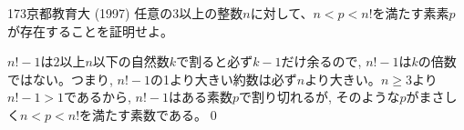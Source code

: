 \begin{prob}{173}{}{京都教育大 (1997)}
 任意の3以上の整数$n$に対して、$n<p<n!$を満たす素素$p$が存在することを証明せよ。
\end{prob}
$n! - 1$は$2$以上$n$以下の自然数$k$で割ると必ず$k-1$だけ余るので, $n!-1$は$k$の倍数ではない。つまり, $n!-1$の1より大きい約数は必ず$n$より大きい。$n\geq 3$より$n!-1>1$であるから, $n!-1$はある素数$p$で割り切れるが, そのような$p$がまさしく$n < p < n!$を満たす素数である。\qed